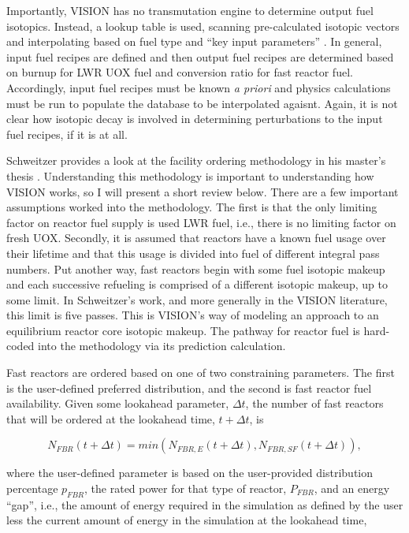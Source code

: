Importantly, VISION has no transmutation engine to determine output fuel
isotopics. Instead, a lookup table is used, scanning pre-calculated isotopic
vectors and interpolating based on fuel type and ``key input parameters''
\cite{jacobson_verifiable_2010}. In general, input fuel recipes are defined and
then output fuel recipes are determined based on burnup for LWR UOX fuel and
conversion ratio for fast reactor fuel. Accordingly, input fuel recipes must be
known \textit{a priori} and physics calculations must be run to populate the
database to be interpolated agaisnt. Again, it is not clear how isotopic decay
is involved in determining perturbations to the input fuel recipes, if it is at
all.

Schweitzer provides a look at the facility ordering methodology in his master's
thesis \cite{schweitzer_improved_2008}. Understanding this methodology is
important to understanding how VISION works, so I will present a short review
below. There are a few important assumptions worked into the methodology. The
first is that the only limiting factor on reactor fuel supply is used LWR fuel,
i.e., there is no limiting factor on fresh UOX. Secondly, it is assumed that
reactors have a known fuel usage over their lifetime and that this usage is
divided into fuel of different integral pass numbers. Put another way, fast
reactors begin with some fuel isotopic makeup and each successive refueling is
comprised of a different isotopic makeup, up to some limit. In Schweitzer's
work, and more generally in the VISION literature, this limit is five
passes. This is VISION's way of modeling an approach to an equilibrium reactor
core isotopic makeup. The pathway for reactor fuel is hard-coded into the
methodology via its prediction calculation. 


Fast reactors are ordered based on one of two constraining parameters. The first
is the user-defined preferred distribution, and the second is fast reactor fuel
availability. Given some lookahead parameter, $\Delta t$, the number of fast
reactors that will be ordered at the lookahead time, $t + \Delta t$, is

\begin{equation*}
N_{FBR}\left(t+\Delta t\right) = min \left( N_{FBR,E}\left(t+\Delta t\right),N_{FBR,SF}\left(t+\Delta t\right)\right),
\end{equation*}

where the user-defined parameter is based on the user-provided distribution
percentage $p_{FBR}$, the rated power for that type of reactor, $P_{FBR}$, and
an energy ``gap'', i.e., the amount of energy required in the simulation as
defined by the user less the current amount of energy in the simulation at the
lookahead time,

